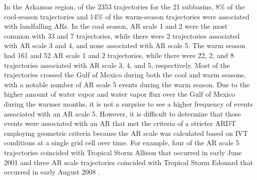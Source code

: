 \documentclass[draft]{agujournal2019}
\begin{document}
In the Arkansas region, of the 2353 trajectories for the 21 subbasins, 8\% of the cool-season trajectories and 14\% of the warm-season trajectories were associated with landfalling ARs. In the cool season, AR scale 1 and 2 were the most common with 33 and 7 trajectories, while there were 2 trajectories associated with AR scale 3 and 4, and none associated with AR scale 5. The warm season had 161 and 52 AR scale 1 and 2 trajectories, while there were 22, 2, and 8 trajectories associated with AR scale 3, 4, and 5, respectively. Most of the trajectories crossed the Gulf of Mexico during both the cool and warm seasons, with a notable number of AR scale 5 events during the warm season. Due to the higher amount of water vapor and water vapor flux over the Gulf of Mexico during the warmer months, it is not a surprise to see a higher frequency of events associated with an AR scale 5. However, it is difficult to determine that those events were associated with an AR that met the criteria of a stricter ARDT employing geometric criteria because the AR scale was calculated based on IVT conditions at a single grid cell over time. For example, four of the AR scale 5 trajectories coincided with Tropical Storm Allison that occurred in early June 2001 and three AR scale trajectories coincided with Tropical Storm Edouard that occurred in early August 2008 \cite{Kemp2001TropicalAllison, UnitedStates.NationalWeatherService2008Tropical2008}.
\end{document}
